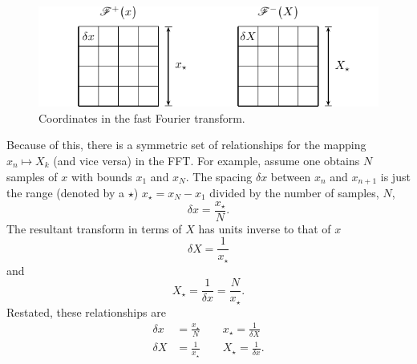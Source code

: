 \begin{figure}[ht]
  \centering
  \includegraphics[keepaspectratio]{appendix/figures/fftdrawing.pdf}
  \caption{Coordinates in the fast Fourier transform.}
  \label{fig:fftdrawing}
\end{figure}
Because of this, there is a symmetric set of relationships for the mapping
$x_n \mapsto X_k$ (and vice versa) in the FFT\@.  For example, assume one
obtains $N$ samples of $x$ with bounds $x_1$ and $x_N$.  The
spacing $\delta x$ between $x_n$ and $x_{n+1}$ is just the range (denoted
by a $\star$)
$x_\star = x_N-x_1$ divided by the number of samples, $N$,
\begin{equation}
  \delta x = \frac{x_\star}{N}.
\end{equation}
The resultant transform in terms of $X$ has units inverse to that of $x$
\begin{equation}
  \delta X = \frac{1}{x_\star}
\end{equation}
and
\begin{equation}
  X_\star=\frac{1}{\delta x}=\frac{N}{x_\star}.
\end{equation}
Restated, these relationships are
\begin{align}
  \delta x & = \frac{x_\star}{N}\qquad x_\star
  =\frac{1}{\delta X}                                                \\
  \delta X & = \frac{1}{x_\star}\qquad X_\star = \frac{1}{\delta x}.
  \label{eqn:fftrelationships}
\end{align}

